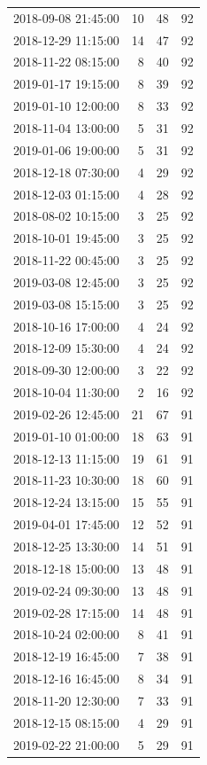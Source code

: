 \begin{tabular}{lrrr}
2018-09-08 21:45:00 & 10 & 48 & 92 \\
2018-12-29 11:15:00 & 14 & 47 & 92 \\
2018-11-22 08:15:00 & 8 & 40 & 92 \\
2019-01-17 19:15:00 & 8 & 39 & 92 \\
2019-01-10 12:00:00 & 8 & 33 & 92 \\
2018-11-04 13:00:00 & 5 & 31 & 92 \\
2019-01-06 19:00:00 & 5 & 31 & 92 \\
2018-12-18 07:30:00 & 4 & 29 & 92 \\
2018-12-03 01:15:00 & 4 & 28 & 92 \\
2018-08-02 10:15:00 & 3 & 25 & 92 \\
2018-10-01 19:45:00 & 3 & 25 & 92 \\
2018-11-22 00:45:00 & 3 & 25 & 92 \\
2019-03-08 12:45:00 & 3 & 25 & 92 \\
2019-03-08 15:15:00 & 3 & 25 & 92 \\
2018-10-16 17:00:00 & 4 & 24 & 92 \\
2018-12-09 15:30:00 & 4 & 24 & 92 \\
2018-09-30 12:00:00 & 3 & 22 & 92 \\
2018-10-04 11:30:00 & 2 & 16 & 92 \\
2019-02-26 12:45:00 & 21 & 67 & 91 \\
2019-01-10 01:00:00 & 18 & 63 & 91 \\
2018-12-13 11:15:00 & 19 & 61 & 91 \\
2018-11-23 10:30:00 & 18 & 60 & 91 \\
2018-12-24 13:15:00 & 15 & 55 & 91 \\
2019-04-01 17:45:00 & 12 & 52 & 91 \\
2018-12-25 13:30:00 & 14 & 51 & 91 \\
2018-12-18 15:00:00 & 13 & 48 & 91 \\
2019-02-24 09:30:00 & 13 & 48 & 91 \\
2019-02-28 17:15:00 & 14 & 48 & 91 \\
2018-10-24 02:00:00 & 8 & 41 & 91 \\
2018-12-19 16:45:00 & 7 & 38 & 91 \\
2018-12-16 16:45:00 & 8 & 34 & 91 \\
2018-11-20 12:30:00 & 7 & 33 & 91 \\
2018-12-15 08:15:00 & 4 & 29 & 91 \\
2019-02-22 21:00:00 & 5 & 29 & 91 \\

\end{tabular}
